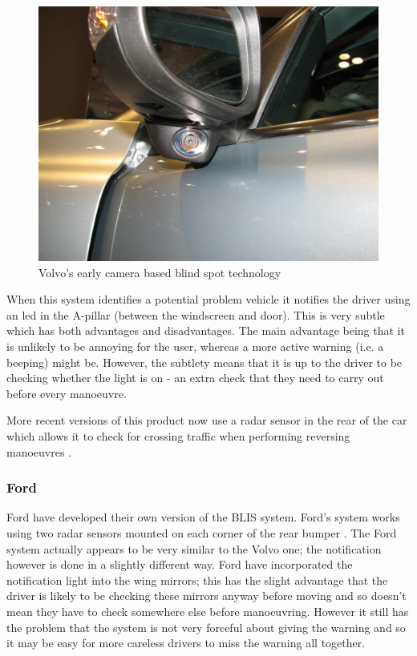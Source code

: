 \documentclass[a4paper]{report}
\begin{document}
{\begin{figure}[h]
\label{fig:volvo_blis}
\centering
\includegraphics[scale=0.1]{figures/research_report/Volvo_BLIS}
\caption{Volvo's early camera based blind spot technology}
\end{figure}

When this system identifies a potential problem vehicle it notifies the driver using an led in the A-pillar (between the windscreen and door). This is very subtle which has both advantages and disadvantages. The main advantage being that it is unlikely to be annoying for the user, whereas a more active warning (i.e. a beeping) might be. However, the subtlety means that it is up to the driver to be checking whether the light is on - an extra check that they need to carry out before every manoeuvre.

More recent versions of this product now use a radar sensor in the rear of the car which allows it to check for crossing traffic when performing reversing manoeuvres \cite{volvo_radar}.

\subsubsection{Ford}
Ford have developed their own version of the BLIS system. Ford's system works using two radar sensors mounted on each corner of the rear bumper \cite{ford_blis}. The Ford system actually appears to be very similar to the Volvo one; the notification however is done in a slightly different way. Ford have incorporated the notification light into the wing mirrors; this has the slight advantage that the driver is likely to be checking these mirrors anyway before moving and so doesn't mean they have to check somewhere else before manoeuvring. However it still has the problem that the system is not very forceful about giving the warning and so it may be easy for more careless drivers to miss the warning all together. 

}
\end{document}
